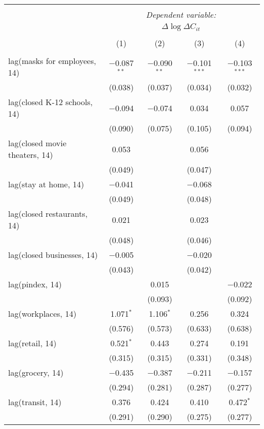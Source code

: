 \begin{tabular}{@{\extracolsep{1pt}}lcccc} 
\\[-1.8ex]\hline 
\hline \\[-1.8ex] 
 & \multicolumn{4}{c}{\textit{Dependent variable:}} \\ 
\cline{2-5} 
 & \multicolumn{4}{c}{$\Delta \log \Delta C_{it}$} \\ 
\\[-1.8ex] & (1) & (2) & (3) & (4)\\ 
\hline \\[-1.8ex] 
 lag(masks for employees, 14) & $-$0.087$^{**}$ & $-$0.090$^{**}$ & $-$0.101$^{***}$ & $-$0.103$^{***}$ \\ 
  & (0.038) & (0.037) & (0.034) & (0.032) \\ 
  lag(closed K-12 schools, 14) & $-$0.094 & $-$0.074 & 0.034 & 0.057 \\ 
  & (0.090) & (0.075) & (0.105) & (0.094) \\ 
  lag(closed movie theaters, 14) & 0.053 &  & 0.056 &  \\ 
  & (0.049) &  & (0.047) &  \\ 
  lag(stay at home, 14) & $-$0.041 &  & $-$0.068 &  \\ 
  & (0.049) &  & (0.048) &  \\ 
  lag(closed restaurants, 14) & 0.021 &  & 0.023 &  \\ 
  & (0.048) &  & (0.046) &  \\ 
  lag(closed businesses, 14) & $-$0.005 &  & $-$0.020 &  \\ 
  & (0.043) &  & (0.042) &  \\ 
  lag(pindex, 14) &  & 0.015 &  & $-$0.022 \\ 
  &  & (0.093) &  & (0.092) \\ 
  lag(workplaces, 14) & 1.071$^{*}$ & 1.106$^{*}$ & 0.256 & 0.324 \\ 
  & (0.576) & (0.573) & (0.633) & (0.638) \\ 
  lag(retail, 14) & 0.521$^{*}$ & 0.443 & 0.274 & 0.191 \\ 
  & (0.315) & (0.315) & (0.331) & (0.348) \\ 
  lag(grocery, 14) & $-$0.435 & $-$0.387 & $-$0.211 & $-$0.157 \\ 
  & (0.294) & (0.281) & (0.287) & (0.277) \\ 
  lag(transit, 14) & 0.376 & 0.424 & 0.410 & 0.472$^{*}$ \\ 
  & (0.291) & (0.290) & (0.275) & (0.277) \\ 

\end{tabular}
